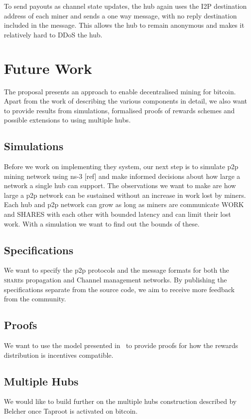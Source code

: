\documentclass{article}
\begin{document}
To send payouts as channel state updates, the hub again uses the I2P
destination address of each miner and sends a one way message, with no
reply destination included in the message. This allows the hub to
remain anonymous and makes it relatively hard to DDoS the hub.

\section{Future Work}

The proposal presents an approach to enable decentralised mining for
bitcoin. Apart from the work of describing the various components in
detail, we also want to provide results from simulations, formalised
proofs of rewards schemes and possible extensions to using multiple
hubs.

\subsection{Simulations}

Before we work on implementing they system, our next step is to
simulate p2p mining network using ns-3 [ref] and make informed
decisions about how large a network a single hub can support. The
observations we want to make are how large a p2p network can be
sustained without an increase in work lost by miners. Each hub and p2p
network can grow as long as miners are communicate WORK and SHARES
with each other with bounded latency and can limit their lost
work. With a simulation we want to find out the bounds of these.

\subsection{Specifications}

We want to specify the p2p protocols and the message formats for both
the \textsc{share}s propagation and Channel management networks. By
publishing the specifications separate from the source code, we aim to
receive more feedback from the community.

\subsection{Proofs}

We want to use the model presented in~\cite{incentives-compatible} to
provide proofs for how the rewards distribution is incentives
compatible.

\subsection{Multiple Hubs}

We would like to build further on the multiple hubs construction
described by Belcher once Taproot is activated on bitcoin.

 

\end{document}
